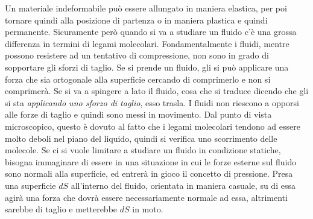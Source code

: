 \documentclass[10pt,a4paper]{book}
\begin{document}
Un materiale indeformabile può essere allungato in maniera elastica, per poi tornare quindi alla posizione di partenza o in maniera plastica e quindi permanente. Sicuramente però quando si va a studiare un fluido c'è una grossa differenza in termini di legami molecolari. Fondamentalmente i fluidi, mentre possono resistere ad un tentativo di compressione, non sono in grado di sopportare gli sforzi di taglio. Se si prende un fluido, gli si può applicare una forza che sia ortogonale alla superficie cercando di comprimerlo e non si comprimerà. Se si va a spingere a lato il fluido, cosa che si traduce dicendo che gli si sta \emph{applicando uno sforzo di taglio}, esso trasla. I fluidi non riescono a opporsi alle forze di taglio e quindi sono messi in movimento. Dal punto di vista microscopico, questo è dovuto al fatto che i legami molecolari tendono ad essere molto deboli nel piano del liquido, quindi si verifica uno scorrimento delle molecole.
Se ci si vuole limitare a studiare un fluido in condizione statiche, bisogna immaginare di essere in una situazione in cui le forze esterne sul fluido sono normali alla superficie, ed entrerà in gioco il concetto di pressione. Presa una superficie $dS$ all'interno del fluido, orientata in maniera casuale, su di essa agirà una forza che dovrà essere necessariamente normale ad essa, altrimenti sarebbe di taglio e metterebbe $dS$ in moto.
\end{document}
